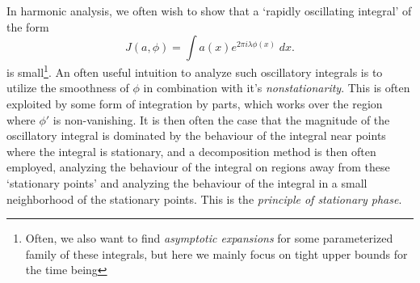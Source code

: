 \begin{comment}


\chapter{AKC - Trigonometric Integrals (1980)}

Let's list the results of AKC, which give some Van der Corput type estimates for one dimensional integrals:
%
\begin{itemize}
	\item If $n > 1$ and $|\partial^n \phi| \geq A$, then
	\[ J(1,\phi) \leq \min(|I|, 6nA^{-1/n}). \]
	If $a$ is piecewise monotonic and continuous (on at most $p$ pieces), with $L^\infty$ norm at most $H$< then
	\[ J(a,\phi) \leq H \min(1, 24pn A^{-1/n}). \]

	\item If $n \geq 1$, and $\phi(x) = \alpha_n x^n + \dots + \alpha_1 x$, and
	\[ H = \min_{x \in I} \sum_r \frac{|(\partial^r \phi)(x)|}{r!}, \]
	then
	\[ J(1,\phi) \leq \min(|I|,6en^3H^{-1}). \]
\end{itemize}

\end{comment}










% 

In harmonic analysis, we often wish to show that a `rapidly oscillating integral' of the form
%
\[ J(a,\phi) = \int a(x) e^{2 \pi i \lambda \phi(x)}\; dx. \]
%
is small\footnote{Often, we also want to find \emph{asymptotic expansions} for some parameterized family of these integrals, but here we mainly focus on tight upper bounds for the time being}. An often useful intuition to analyze such oscillatory integrals is to utilize the smoothness of $\phi$ in combination with it's \emph{nonstationarity}. This is often exploited by some form of integration by parts, which works over the region where $\phi'$ is non-vanishing. It is then often the case that the magnitude of the oscillatory integral is dominated by the behaviour of the integral near points where the integral is stationary, and a decomposition method is then often employed, analyzing the behaviour of the integral on regions away from these `stationary points' and analyzing the behaviour of the integral in a small neighborhood of the stationary points. This is the \emph{principle of stationary phase}.



